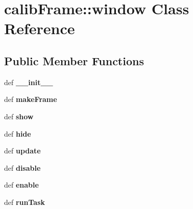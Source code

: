 \section{calib\-Frame::window Class Reference}
\label{classcalibFrame_1_1window}
\subsection*{Public Member Functions}
\begin{CompactItemize}
\item 
def \textbf{\_\-\_\-init\_\-\_\-}\label{classcalibFrame_1_1window_d5e04d18d63d09e321190139ef0a7bc0}

\item 
def \textbf{make\-Frame}\label{classcalibFrame_1_1window_97e4321c21bad9765f2a9b4c1dd21ec5}

\item 
def \textbf{show}\label{classcalibFrame_1_1window_4e8ee7734b1901de09d408953ee4831c}

\item 
def \textbf{hide}\label{classcalibFrame_1_1window_358c2cb4c37e990480378ecf282c170f}

\item 
def \textbf{update}\label{classcalibFrame_1_1window_6d58b223b8fd49b226baf35b3381ffbb}

\item 
def \textbf{disable}\label{classcalibFrame_1_1window_255027b51999d6a08b3d44a2cb3d141e}

\item 
def \textbf{enable}\label{classcalibFrame_1_1window_8610595111d5e62dae720a29c93c22f3}

\item 
def \textbf{run\-Task}\label{classcalibFrame_1_1window_f36f4b2354a64c5deda47446fc9db4c0}

\end{CompactItemize}
